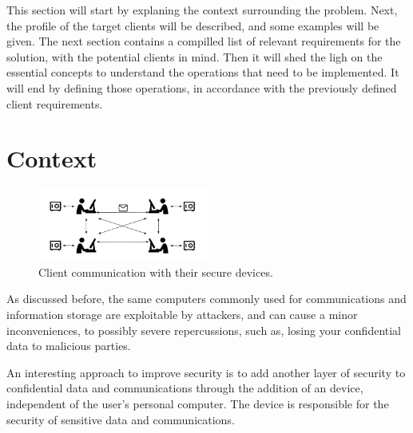 \cleardoublepage
\label{chap:problem}

This section will start by explaning the context surrounding the problem.
Next, the profile of the target clients will be described, and some examples will be given.
The next section contains a compilled list of relevant requirements for the solution, with the potential clients in mind.
Then it will shed the ligh on the essential concepts to understand the operations that need to be implemented. It will end by defining those operations, in accordance with the previously defined client requirements.

\section{Context} \label{chap:problem:context}

\begin{figure}[h]
    \centering
    \includegraphics[width=0.5\textwidth]{./Images/main-figure.png}
    \caption{Client communication with their secure devices.}
    \label{fig:main-system}
\end{figure}

As discussed before, the same computers commonly used for communications and information storage are exploitable by attackers, and can cause a minor inconveniences, to possibly severe repercussions, such as, losing your confidential data to malicious parties.

An interesting approach to improve security is to add another layer of security to confidential data and communications through the addition of an device, independent of the user's personal computer. The device is responsible for the security of sensitive data and communications.

